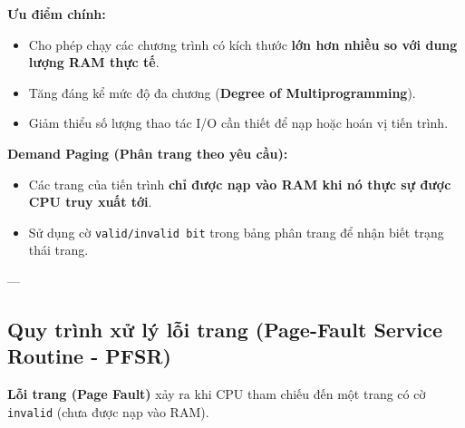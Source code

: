 \documentclass[11pt,a4paper]{article}
\begin{document}
\textbf{Ưu điểm chính:}
\begin{itemize}[noitemsep]
    \item Cho phép chạy các chương trình có kích thước \textbf{lớn hơn nhiều so với dung lượng RAM thực tế}.
    \item Tăng đáng kể mức độ đa chương (\textbf{Degree of Multiprogramming}).
    \item Giảm thiểu số lượng thao tác I/O cần thiết để nạp hoặc hoán vị tiến trình.
\end{itemize}

\textbf{Demand Paging (Phân trang theo yêu cầu):}
\begin{itemize}[noitemsep]
    \item Các trang của tiến trình \textbf{chỉ được nạp vào RAM khi nó thực sự được CPU truy xuất tới}.
    \item Sử dụng cờ \texttt{valid/invalid bit} trong bảng phân trang để nhận biết trạng thái trang.
\end{itemize}

---

\subsection{Quy trình xử lý lỗi trang (Page-Fault Service Routine - PFSR)}
\textbf{Lỗi trang (Page Fault)} xảy ra khi CPU tham chiếu đến một trang có cờ \texttt{invalid} (chưa được nạp vào RAM).
\end{document}
